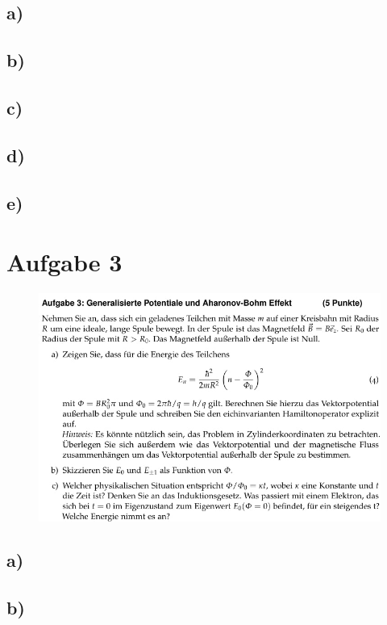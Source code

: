 \subsection{a)}

\subsection{b)}

\subsection{c)}

\subsection{d)}

\subsection{e)}

\section{Aufgabe 3}
\begin{figure}[H]
    \centering
    \includegraphics[width=\textwidth]{images/Aufgabe3.jpg}
\end{figure}

\subsection{a)}

\subsection{b)}

